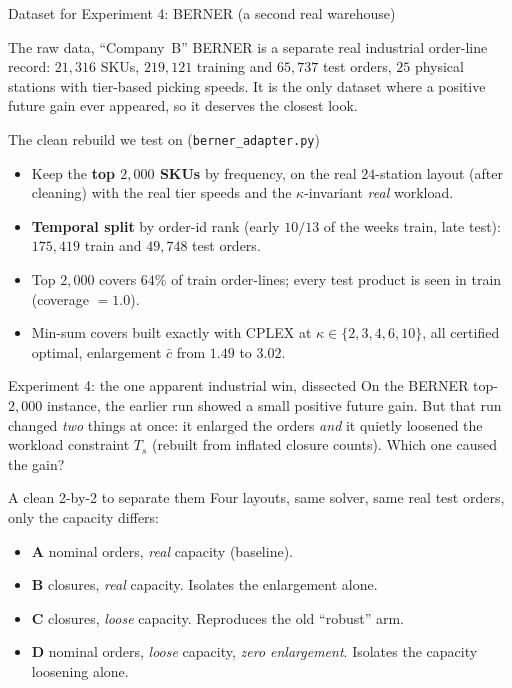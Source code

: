 \documentclass[11pt,aspectratio=169]{beamer}
\begin{document}
\begin{frame}{Dataset for Experiment 4: BERNER (a second real warehouse)}
  \begin{block}{The raw data, ``Company~B''}
  BERNER is a separate real industrial order-line record: $21{,}316$ SKUs, $219{,}121$ training and $65{,}737$ test orders, $25$ physical stations with tier-based picking speeds. It is the only dataset where a positive future gain ever appeared, so it deserves the closest look.
  \end{block}
  \begin{block}{The clean rebuild we test on (\texttt{berner\_adapter.py})}
  \begin{itemize}
    \item Keep the \textbf{top $2{,}000$ SKUs} by frequency, on the real $24$-station layout (after cleaning) with the real tier speeds and the $\kappa$-invariant \emph{real} workload.
    \item \textbf{Temporal split} by order-id rank (early $10/13$ of the weeks train, late test): $175{,}419$ train and $49{,}748$ test orders.
    \item Top $2{,}000$ covers $64\%$ of train order-lines; every test product is seen in train (coverage $=1.0$).
    \item Min-sum covers built exactly with CPLEX at $\kappa\in\{2,3,4,6,10\}$, all certified optimal, enlargement $\bar c$ from $1.49$ to $3.02$.
  \end{itemize}
  \end{block}
\end{frame}

\begin{frame}{Experiment 4: the one apparent industrial win, dissected}
  On the BERNER top-$2{,}000$ instance, the earlier run showed a small positive future gain. But that run changed \emph{two} things at once: it enlarged the orders \emph{and} it quietly loosened the workload constraint $T_s$ (rebuilt from inflated closure counts). Which one caused the gain?
  \begin{block}{A clean 2-by-2 to separate them}
  Four layouts, same solver, same real test orders, only the capacity differs:
  \begin{itemize}
    \item \textbf{A} nominal orders, \emph{real} capacity (baseline).
    \item \textbf{B} closures, \emph{real} capacity. Isolates the enlargement alone.
    \item \textbf{C} closures, \emph{loose} capacity. Reproduces the old ``robust'' arm.
    \item \textbf{D} nominal orders, \emph{loose} capacity, \emph{zero enlargement}. Isolates the capacity loosening alone.
  \end{itemize}
  \end{block}
\end{frame}
\end{document}
